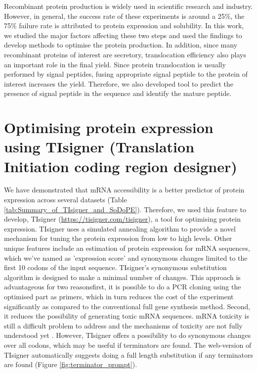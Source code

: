 Recombinant protein production is widely used in scientific research and industry. However, in general, the success rate of these experiments is around a 25\%, the 75\% failure rate is attributed to protein expression and solubility. In this work, we studied the major factors affecting these two steps and used the findings to develop methods to optimise the protein production. In addition, since many recombinant proteins of interest are secretory, translocation efficiency also plays an important role in the final yield. Since protein translocation is usually performed by signal peptides, fusing appropriate signal peptide to the protein of interest increases the yield. Therefore, we also developed tool to predict the presence of signal peptide in the sequence and identify the mature peptide. 

\section{Optimising protein expression using TIsigner (Translation Initiation coding region designer)}
We have demonstrated that mRNA accessibility is a better predictor of protein expression across several datasets (Table \ref{tab:Summary_of_TIsigner_and_SoDoPE}). Therefore, we used this feature to develop, TIsigner (\href{https://tisigner.com/tisigner}{https://tisigner.com/tisigner}), a tool for optimising protein expression. TIsigner uses a simulated annealing algorithm to provide a novel mechanism for tuning the protein expression from low to high levels. Other unique features include an estimation of protein expression for mRNA sequences, which we've named as 'expression score' and synonymous changes limited to the first 10 codons of the input sequence. TIsigner's synonymous substitution algorithm is designed to make a minimal number of changes. This approach is advantageous for two reasons\textemdash first, it is possible to do a PCR cloning using the optimised part as primers, which in turn reduces the cost of the experiment significantly as compared to the conventional full gene synthesis method. Second, it reduces the possibility of generating toxic mRNA sequences. mRNA toxicity is still a difficult problem to address and the mechanisms of toxicity are not fully understood yet \cite{mittal2018codon}. However, TIsigner offers a possibility to do synonymous changes over all codons, which may be useful if terminators are found. The web-version of TIsigner automatically suggests doing a full length substitution if any terminators are found (Figure \ref{fig:terminator_prompt}).

